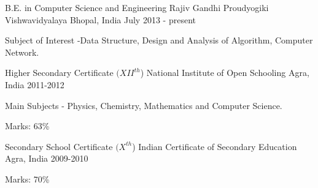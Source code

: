\begin{cventries}
 \cventry
    {B.E. in Computer Science and Engineering}
    {Rajiv Gandhi Proudyogiki Vishwavidyalaya}
    {Bhopal, India}
    {July 2013 - present}
    {
      \begin{cvitems}
        \item {Subject of Interest -Data Structure, Design and Analysis of Algorithm, Computer Network.}
      \end{cvitems}
    }
    
    \cventry
    {Higher Secondary Certificate $(XII^{th}$)}
    {National Institute of Open Schooling}
    {Agra, India}
    {2011-2012}
    {
      \begin{cvitems}
        \item {Main Subjects - Physics, Chemistry, Mathematics and Computer Science.}
        \item {Marks: 63\%}
      \end{cvitems}
    }
     \cventry
    {Secondary School Certificate $(X^{th}$)}
    {Indian Certificate of Secondary Education}
    {Agra, India}
    {2009-2010}
    {
      \begin{cvitems}
        \item {Marks: 70\%}
      \end{cvitems}
    }
    
\end{cventries}
